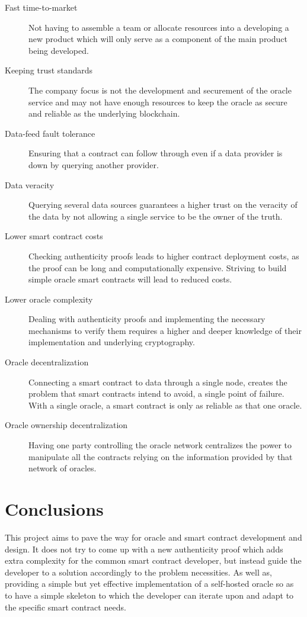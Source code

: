 \begin{description}
    \item [Fast time-to-market] Not having to assemble a team or allocate resources into a developing a new product which will only serve as a component of the main product being developed.
    \item [Keeping trust standards] The company focus is not the development and securement of the oracle service and may not have enough resources to keep the oracle as secure and reliable as the underlying blockchain.
    \item [Data-feed fault tolerance] Ensuring that a  contract can follow through even if a data provider is down by querying another provider.
    \item [Data veracity] Querying several data sources guarantees a higher trust on the veracity of the data by not allowing a single service to be the owner of the truth.
    \item [Lower smart contract costs] Checking authenticity proofs leads to higher contract deployment costs, as the proof can be long and computationally expensive. Striving to build simple oracle smart contracts will lead to reduced costs.
    \item [Lower oracle complexity] Dealing with authenticity proofs and implementing the necessary mechanisms to verify them requires a higher and deeper knowledge of their implementation and underlying cryptography.
    \item [Oracle decentralization] Connecting a smart contract to data through a single node, creates the problem that smart contracts intend to avoid, a single point of failure.  With a single oracle, a smart contract is only as reliable as that one oracle.
    \item [Oracle ownership decentralization] Having one party controlling the oracle network centralizes the power to manipulate all the contracts relying on the information provided by that network of oracles.
\end{description}


\section{Conclusions}
This project aims to pave the way for oracle and smart contract development and design. It does not try to come up with a new authenticity proof which adds extra complexity for the common smart contract developer, but instead guide the developer to a solution accordingly to the problem necessities. As well as, providing a simple but yet effective implementation of a self-hosted oracle so as to have a simple skeleton to which the developer can iterate upon and adapt to the specific smart contract needs.